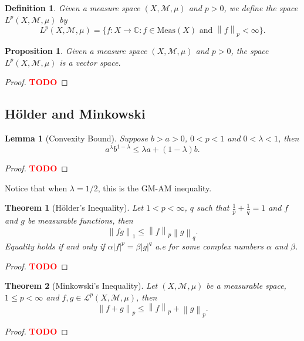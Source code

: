 \documentclass{article}
\newtheorem*{theorem}{Theorem}
\newtheorem*{proposition}{Proposition}
\newtheorem*{lemma}{Lemma}
\newtheorem*{definition}{Definition}
\newcommand{\C}{\mathbb{C}}
\newcommand{\M}{\mathcal{M}}
\renewcommand{\L}{\mathcal{L}}
\newcommand{\lnorm}[2]{\left\lVert#2 \right\rVert_{#1}}
\newcommand{\td}{\textcolor{red}{\textbf{TODO}}}
\begin{document}
\begin{definition}
    Given a measure space $(X, \M, \mu)$ and $p > 0$, we define the space $L^p(X, \M, \mu)$ by
    $$L^p(X, \M, \mu) = \{f : X \to \C : f\in \text{Meas}(X) \text{ and } \lnorm{p}{f} < \infty\}.$$
\end{definition}

\begin{proposition}
    Given a measure space $(X, \M, \mu)$ and $p > 0$, the space $L^p(X, \M, \mu)$ is a vector space.
\end{proposition}

\begin{proof}
    \td 
\end{proof}


\subsection{Hölder and Minkowski}

\begin{lemma}[Convexity Bound]
    Suppose $b > a > 0$, $0 < p < 1$ and $0 < \lambda < 1$, then
    $$a^{\lambda} b^{1 - \lambda} \leq \lambda a + (1 - \lambda) b. $$
\end{lemma}

\begin{proof}
    \td
\end{proof}

Notice that when $\lambda = 1/2$, this is the GM-AM inequality. 

\begin{theorem}[Hölder's Inequality]
    Let $1 < p < \infty$, $q$ such that $\frac{1}{p} + \frac{1}{q} = 1$ and $f$ and $g$ be measurable functions, then
    $$\lnorm{1}{fg} \leq \lnorm{p}{f} \lnorm{q}{g}.$$
    Equality holds if and only if $\alpha |f|^p = \beta |g|^q$ a.e for some complex numbers $\alpha$ and $\beta$.
\end{theorem}

\begin{proof}
    \td 
\end{proof}

\begin{theorem}[Minkowski's Inequality]
    Let $(X, \M, \mu)$ be a measurable space, $1 \leq p < \infty$ and $f,g \in \L^p(X, \M, \mu)$, then
    $$\lnorm{p}{f+g} \leq \lnorm{p}{f} + \lnorm{p}{g}.$$
\end{theorem}

\begin{proof}
    \td 
\end{proof}
\end{document}
